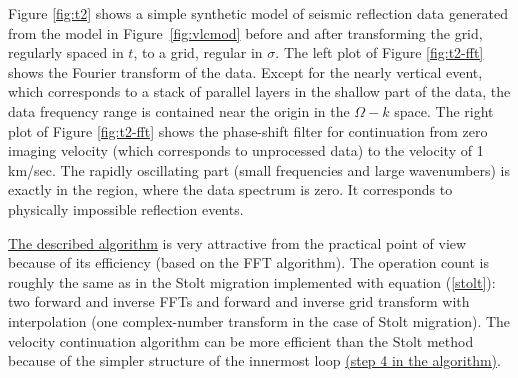 Figure \ref{fig:t2} shows a simple synthetic model of seismic
reflection data generated from the model in Figure~\ref{fig:vlcmod}
before and after transforming the grid, regularly spaced in $t$, to a
grid, regular in $\sigma$. The left plot of Figure \ref{fig:t2-fft}
shows the Fourier transform of the data. Except for the nearly
vertical event, which corresponds to a stack of parallel layers in the
shallow part of the data, the data frequency range is contained near
the origin in the $\Omega-k$ space.  The right plot of Figure
\ref{fig:t2-fft} shows the phase-shift filter for continuation from
zero imaging velocity (which corresponds to unprocessed data) to the
velocity of 1 km/sec. The rapidly oscillating part (small frequencies
and large wavenumbers) is exactly in the region, where the data
spectrum is zero. It corresponds to physically impossible reflection
events.


\uline{The described algorithm}
 is very attractive from the practical point of view
because of its efficiency (based on the FFT algorithm). The operation count is
roughly the same as in the Stolt migration implemented with equation
(\ref{stolt}): two forward and inverse FFTs and forward and inverse grid
transform with interpolation (one complex-number transform in the case of
Stolt migration). The velocity continuation algorithm can be more efficient
than the Stolt method because of the simpler structure of the innermost loop
\uline{(step 4 in the algorithm)}. 

